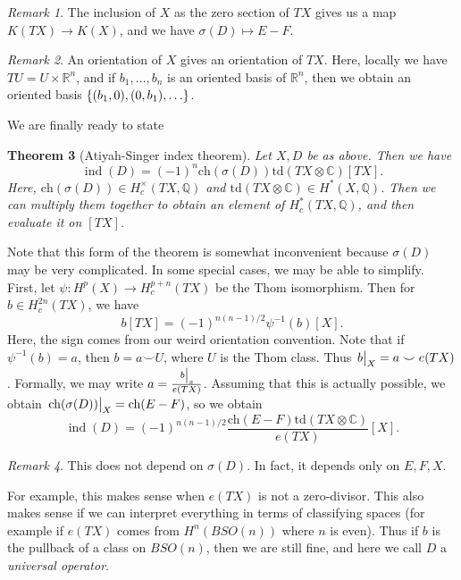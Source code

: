 \documentclass[leqno, openany]{memoir}
\newtheorem{thm}{Theorem}[section]
\theoremstyle{definition}
\theoremstyle{remark}
\newtheorem{rmk}[thm]{Remark}
\theoremstyle{plain}
\theoremstyle{definition}
\theoremstyle{remark}
\newcommand{\R}{\mathbb{R}}
\newcommand{\C}{\mathbb{C}}
\newcommand{\Q}{\mathbb{Q}}
\newcommand{\mr}[1]{\mathrm{#1}}
\DeclareMathOperator{\ch}{ch}
\DeclareMathOperator{\ind}{ind}
\begin{document}
\begin{rmk} The inclusion of $X$ as the zero section of $TX$ gives us a map
$K(TX) \to K(X)$, and we have $\sigma(D) \mapsto E-F$.  \end{rmk}

\begin{rmk} An orientation of $X$ gives an orientation of $TX$. Here, locally
we have $TU = U \times \R^n$, and if $b_1, \ldots, b_n$ is an oriented basis of
$\R^n$, then we obtain an oriented basis $\qty{(b_1, 0), (0, b_1), \ldots}$.
\end{rmk}

We are finally ready to state

\begin{thm}[Atiyah-Singer index theorem] Let $X, D$ be as above. Then we have
    \[ \ind(D) = {(-1)}^n \mr{ch}(\sigma(D)) \mr{td}(TX \otimes \C) [TX]. \]
    Here, $\mr{ch}(\sigma(D)) \in H_c^{\times}(TX, \Q)$ and $\mr{td}(TX \otimes
    \C) \in H^*(X, \Q)$. Then we can multiply them together to obtain an
    element of $H_c^*(TX, \Q)$, and then evaluate it on $[TX]$.  \end{thm}

Note that this form of the theorem is somewhat inconvenient because $\sigma(D)$
may be very complicated. In some special cases, we may be able to simplify.
First, let $\psi \colon H^p(X) \to H_c^{p+n}(TX)$ be the Thom isomorphism. Then
for $b \in H_c^{2n}(TX)$, we have \[ b[TX] = {(-1)}^{n(n-1)/2} \psi^{-1}(b)
[X]. \] Here, the sign comes from our weird orientation convention. Note that
if $\psi^{-1}(b) = a$, then $b = a \smile U$, where $U$ is the Thom class. Thus
$\eval{b}_X = a \smile e(TX)$. Formally, we may write $a =
\frac{\eval{b}_x}{e(TX)}$. Assuming that this is actually possible, we obtain
$\eval{ \ch(\sigma(D)) }_X = \ch(E-F)$, so we obtain \[ \ind(D) =
    {(-1)}^{n(n-1)/2} \frac{\mr{ch}(E-F) \mr{td}(TX \otimes \C)}{e(TX)} [X]. \]
    \begin{rmk} This does not depend on $\sigma(D)$. In fact, it depends only
    on $E, F, X$.  \end{rmk} For example, this makes sense when $e(TX)$ is not
    a zero-divisor. This also makes sense if we can interpret everything in
    terms of classifying spaces (for example if $e(TX)$ comes from
    $H^n(BSO(n))$ where $n$ is even). Thus if $b$ is the pullback of a class on
    $BSO(n)$, then we are still fine, and here we call $D$ a \textit{universal
    operator}.
\end{document}
